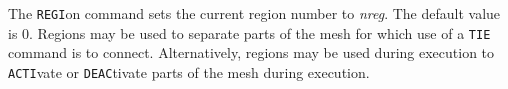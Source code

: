 \headb

The {\tt REGI}on command sets the current region
number to {\it nreg}.  The default value is 0.
Regions may be used to separate parts of the mesh for which use
of a {\tt TIE} command is to connect.  Alternatively, regions may
be used during execution to {\tt ACTI}vate or {\tt DEAC}tivate parts
of the mesh during execution.
\vfil\eject
